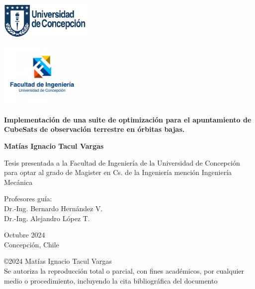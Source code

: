 	
\begin{minipage}{0.35\textwidth}
	\flushleft
	\includegraphics[height=50pt]{udec.png}
\end{minipage}
\begin{minipage}{0.65\textwidth}
	\flushright
	\includegraphics[height=90pt]{logo_FI.png}
\end{minipage}

\vspace{2cm} %
	
\begin{center}

{\Large
\textbf{Implementación de una suite de optimización para el apuntamiento de CubeSats de observación terrestre en órbitas bajas.\\}
}
\vspace{2.5cm}

{\large
\textbf{Matías Ignacio Tacul Vargas\\}
}
\vspace{2.5cm}

{\normalsize
Tesis presentada a la Facultad de Ingeniería de la Universidad de Concepción para optar al grado de Magister en Cs. de la Ingeniería mención Ingeniería Mecánica\\
}
\vspace{2.5cm}


{\normalsize
Profesores guía:\\
Dr.-Ing. Bernardo Hernández V. \\
Dr.-Ing. Alejandro López T.
}
\vspace{0.5cm}

{\normalsize
Octubre 2024\\
Concepción, Chile
}
\vspace*{\fill}




\end{center}

{\footnotesize
\copyright 2024 Matías Ignacio Tacul Vargas\\
Se autoriza la reproducción total o parcial, con fines académicos, por cualquier medio o procedimiento, incluyendo la cita bibliográfica del documento
}
\vspace{0.5cm}

